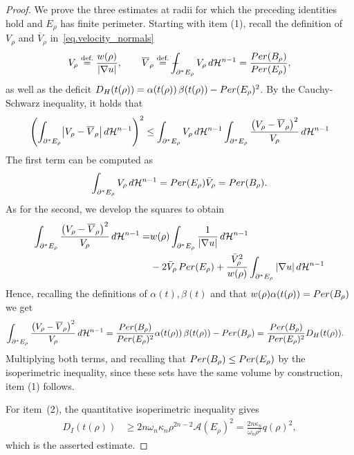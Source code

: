 \documentclass[10pt,a4paper]{amsart}
\newcommand\Per{\mathop{\rm Per}}
\def\XXint#1#2#3{{\setbox0=\hbox{$#1{#2#3}{\int}$}
  \vcenter{\hbox{$#2#3$}}\kern-.5\wd0}}
\def\Xint#1{\mathchoice{\XXint\displaystyle\textstyle{#1}}%
  {\XXint\textstyle\scriptstyle{#1}}%
  {\XXint\scriptstyle\scriptscriptstyle{#1}}%
  {\XXint\scriptscriptstyle\scriptscriptstyle{#1}}%
  \!\int}
\newcommand{\dHn}{\,\dd\mathcal{H}^{n-1}}
\def\dd{{\rm d}}
\newcommand{\eqdef}{\overset{\text{def.}}{=}}
\def\fint{\Xint-}
\begin{document}
\begin{proof}
We prove the three estimates at radii for which the preceding identities hold and $E_\rho$ has finite perimeter. Starting with item (1), recall the definition of $V_\rho$ and $\overline{V}_\rho$ in~\eqref{eq.velocity_normals}
\[
  V_\rho\eqdef\frac{w(\rho)}{|\nabla u|},\qquad
  \overline{V}_\rho\eqdef\fint_{\partial^*E_\rho}V_\rho\dHn=\frac{\Per(B_\rho)}{\Per(E_\rho)},
\]
as well as the deficit $D_H(t(\rho))=\alpha(t(\rho))\,\beta(t(\rho))-\Per(E_\rho)^2$. By the Cauchy-Schwarz inequality, it holds that
\begin{align*}
  \left(\int_{\partial^*E_\rho}
  \bigl|V_\rho-\overline{V}_\rho\bigr|\dHn\right)^{2}
  \le
  \int_{\partial^*E_\rho}V_\rho\dHn
  \int_{\partial^*E_\rho}\frac{\bigl(V_\rho-\overline{V}_\rho\bigr)^2}{V_\rho}\dHn
\end{align*}
The first term can be computed as
\[
  \int_{\partial^*E_\rho}V_\rho\dHn = \Per(E_\rho) \bar V_\rho = \Per(B_\rho).
\]
As for the second, we develop the squares to obtain
  \begin{align*}
  \int_{\partial^*E_\rho}\frac{\bigl(V_\rho-\overline{V}_\rho\bigr)^2}{V_\rho}\dHn
  = &
  w(\rho)\int_{\partial^* E_\rho} \frac{1}{|\nabla u|} \dHn\\
  & 
  -2\bar V_\rho \Per(E_\rho)
  +
  \frac{\bar V_\rho^2}{w(\rho)} \int_{\partial^* E_\rho}|\nabla u| \dHn
\end{align*}
Hence, recalling the definitions of $\alpha(t), \beta(t)$ and that $w(\rho)\alpha(t(\rho))=\Per(B_\rho)$ we get
\begin{align*}
    \int_{\partial^*E_\rho}\frac{\bigl(V_\rho-\overline{V}_\rho\bigr)^2}{V_\rho}\dHn
    &=\frac{\Per(B_\rho)}{\Per(E_\rho)^2} \alpha(t(\rho))\,\beta(t(\rho))-\Per(B_\rho)
    =\frac{\Per(B_\rho)}{\Per(E_\rho)^2} D_H(t(\rho)).
\end{align*}
Multiplying both terms, and recalling that $\Per(B_\rho) \le \Per(E_\rho)$
by the isoperimetric inequality, since these sets have the same volume by construction, item (1) follows.

For item~(2), the quantitative isoperimetric inequality gives
\begin{align*}
 D_I(t(\rho))
 &\ge 2n\omega_n\kappa_n\rho^{2n-2}\mathcal A(E_\rho)^2
 =\frac{2n\kappa_n}{\omega_n\rho^2}q(\rho)^2,
\end{align*}
which is the asserted estimate.


\end{proof}
\end{document}
